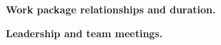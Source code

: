 \documentclass[a4paper,11pt]{article}
\newcommand{\solidbowtie}{\blacktriangleright\!\!\blacktriangleleft}
\newcommand{\deliv}{\textcolor{deliverable}{\raisebox{-.25em}{\DiamondSolid}}}
\newcommand{\teamm}[2]{\raisebox{-.25em}{\ensuremath{\overset{\textup{#1}}{\text{\textcolor{#2}{$\solidbowtie$}}}}}}
\newcommand{\tmN}{\teamm{N}{nottColour}}
\newcommand{\tmS}{\teamm{S}{strathColour}}
\renewcommand{\paragraph}[1]{\textbf{#1.}}
\begin{document}

\paragraph{Work package relationships and duration}


\paragraph{Leadership and team meetings}


\printbibliography
\end{document}

